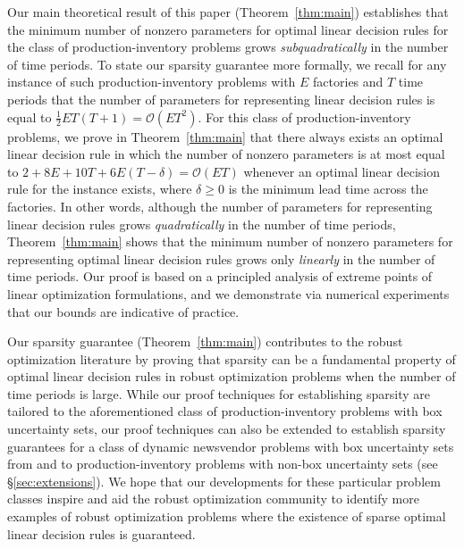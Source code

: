 \documentclass[nonblindrev,mnsc]{informs3} %
\begin{document}
Our main theoretical result  of this paper (Theorem~\ref{thm:main}) establishes that the minimum number of nonzero parameters for optimal linear decision rules for the class of production-inventory problems grows \emph{subquadratically} in the number of time periods.  To state our  sparsity guarantee more formally, we recall for any instance of such production-inventory problems with $E$ factories and $T$ time periods that the number of parameters for representing linear decision rules is  equal to $\frac{1}{2} ET(T+1) = \mathcal{O}(ET^2)$. For this class of production-inventory problems, we prove in Theorem~\ref{thm:main} that there always exists an optimal linear decision rule in which the number of nonzero parameters is at most equal to $2 + 8E + 10T + 6E(T-\delta) = \mathcal{O}(ET)$ whenever an optimal linear decision rule for the instance exists, where $\delta \ge 0$ is the minimum lead time across the factories. In other words, although the number of parameters for representing linear decision rules grows \emph{quadratically} in the number of time periods, Theorem~\ref{thm:main} shows that the minimum number of {nonzero} parameters for representing {optimal} linear decision rules grows only \emph{linearly} in the number of time periods.  Our proof is  based on a principled analysis of extreme points of linear optimization formulations, and we demonstrate
via numerical experiments that our bounds are indicative of practice.


Our sparsity guarantee (Theorem~\ref{thm:main}) contributes to the robust optimization literature by proving that sparsity can be a fundamental property of optimal linear decision rules in  robust optimization problems when the number of time periods is large. 
While our proof techniques for establishing sparsity are   tailored to the aforementioned  class of production-inventory problems with box uncertainty sets, our proof techniques  can also be extended to establish sparsity guarantees for a class of dynamic newsvendor problems with box uncertainty sets from \cite{ben2005retailer,bertsimas2010optimality,iancu2013supermodularity} and to production-inventory problems with non-box uncertainty sets (see \S\ref{sec:extensions}). 
 We hope that our developments for these  particular  problem classes  inspire and aid the robust optimization community to identify more examples of robust optimization problems where the existence of sparse optimal linear decision rules  is guaranteed.
\end{document}
